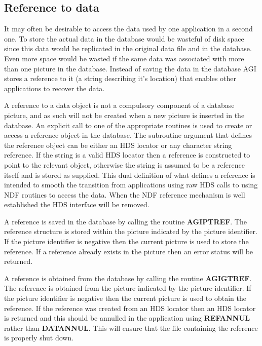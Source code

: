 \documentclass[twoside,11pt]{article}
\newcommand{\htmlref}[2]{#1}
\newcommand{\xref}[3]{#1}
\renewcommand{\_}{\texttt{\symbol{95}}}
\begin{document}
\subsection{Reference to data}
It may often be desirable to access the data used by one application
in a second one. To store the actual data in the database would be wasteful
of disk space since this data would be replicated in the original data file
and in the database. Even more space would be wasted if the same data
was associated with more than one picture in the database. Instead of
saving the data in the database AGI stores a reference to it (a string
describing it's location) that enables other applications to recover the
data.

A reference to a data object is not a compulsory component of a database
picture, and as such will not be created when a new picture is inserted
in the database.
An explicit call to one of the appropriate routines is used
to create or access a reference object in the database.
The subroutine argument that defines the reference object can be either
an HDS locator or any character string reference. If the string is a
valid HDS locator then a reference is constructed to point to the
relevant object, otherwise the string is assumed to be a reference
itself and is stored as supplied. This dual definition of what defines
a reference is intended to smooth the transition from applications
using raw HDS calls to using NDF routines to access the data. When the
NDF reference mechanism is well established the HDS interface will be
removed.

A reference is saved in the database by calling the routine
\htmlref{{\bf AGI\_PTREF}}{AGI_PTREF}. The reference
structure is stored within the picture indicated by the picture
identifier. If the picture identifier is negative then the current
picture is used to store the reference. If a reference already exists
in the picture then an error status will be returned.

A reference is obtained from the database by calling the routine
\htmlref{{\bf AGI\_GTREF}}{AGI_GTREF}. 
The reference is obtained from the picture indicated
by the picture identifier. If the picture identifier is negative then
the current picture is used to obtain the reference.
If the reference was created from an HDS locator then an HDS locator
is returned and this should be annulled in the application using
\xref{{\bf REF\_ANNUL}}{sun31}{REF_ANNUL}
rather than \xref{{\bf DAT\_ANNUL}}{sun92}{DAT_ANNUL}. This will ensure that
the file containing the reference is properly shut down.
\end{document}
